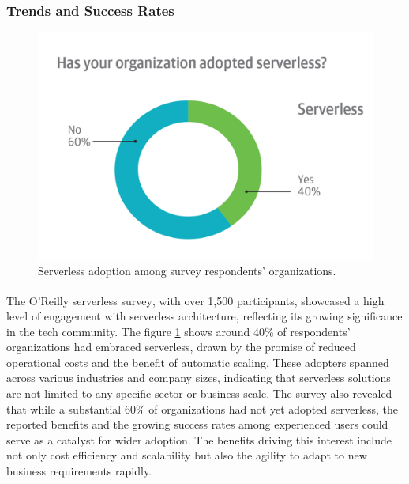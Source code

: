 \subsubsection{Trends and Success Rates}

\begin{figure}
    \centering
    \includegraphics[scale=0.2]{Pictures/3_serverless_adoption.png}
    \caption{Serverless adoption among survey respondents’ organizations.}
    \label{fig:3_serverless_adoption}
\end{figure}

The O'Reilly serverless survey\textsuperscript{\cite{serverless_7}}, with over 1,500 participants,
showcased a high level of engagement with serverless architecture, reflecting its growing
significance in the tech community. The figure \ref{fig:3_serverless_adoption} shows around 40\% of
respondents' organizations had embraced serverless, drawn by the promise of reduced operational
costs and the benefit of automatic scaling. These adopters spanned across various industries and
company sizes, indicating that serverless solutions are not limited to any specific sector or
business scale. The survey also revealed that while a substantial 60\% of organizations had not yet
adopted serverless, the reported benefits and the growing success rates among experienced users
could serve as a catalyst for wider adoption. The benefits driving this interest include not only
cost efficiency and scalability but also the agility to adapt to new business requirements rapidly.

